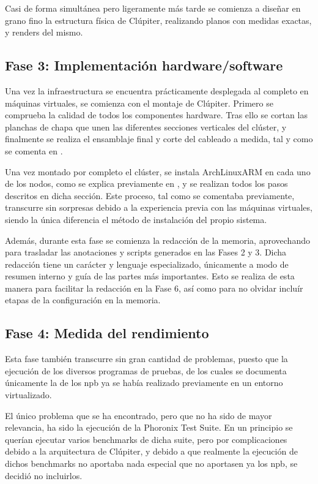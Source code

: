 Casi de forma simultánea pero ligeramente más tarde se comienza a diseñar en grano fino la estructura física de Clúpiter, realizando planos con medidas exactas, y renders del mismo.

\subsection{Fase 3: Implementación hardware/software}
Una vez la infraestructura se encuentra prácticamente desplegada al completo en máquinas virtuales, se comienza con el montaje de Clúpiter. Primero se comprueba la calidad de todos los componentes hardware. Tras ello se cortan las planchas de chapa que unen las diferentes secciones verticales del clúster, y finalmente se realiza el ensamblaje final y corte del cableado a medida, tal y como se comenta en .

Una vez montado por completo el clúster, se instala ArchLinuxARM en cada uno de los nodos, como se explica previamente en , y se realizan todos los pasos descritos en dicha sección. Este proceso, tal como se comentaba previamente, transcurre sin sorpresas debido a la experiencia previa con las máquinas virtuales, siendo la única diferencia el método de instalación del propio sistema.

Además, durante esta fase se comienza la redacción de la memoria, aprovechando para trasladar las anotaciones y scripts generados en las Fases 2 y 3. Dicha redacción tiene un carácter y lenguaje especializado, únicamente a modo de resumen interno y guía de las partes más importantes. Esto se realiza de esta manera para facilitar la redacción en la Fase 6, así como para no olvidar incluír etapas de la configuración en la memoria.

\subsection{Fase 4: Medida del rendimiento}
Esta fase también transcurre sin gran cantidad de problemas, puesto que la ejecución de los diversos programas de pruebas, de los cuales se documenta únicamente la de los \acrlong{npb} ya se había realizado previamente en un entorno virtualizado.

El único problema que se ha encontrado, pero que no ha sido de mayor relevancia, ha sido la ejecución de la Phoronix Test Suite. En un principio se querían ejecutar varios benchmarks de dicha suite, pero por complicaciones debido a la arquitectura de Clúpiter, y debido a que realmente la ejecución de dichos benchmarks no aportaba nada especial que no aportasen ya los \acrshort{npb}, se decidió no incluirlos. 

